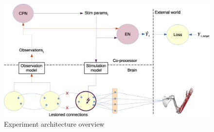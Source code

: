 \documentclass[12pt]{iopart}
\begin{document}
\begin{figure}
\includegraphics[width=\textwidth]{cpn_michaels_arch_labeled.eps}
\caption{Experiment architecture overview}
\centering
\label{fig:exp_overview}
\end{figure}
\end{document}
